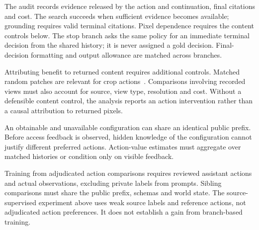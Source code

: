 The audit records evidence released by the action and continuation, final citations and cost. The search succeeds when sufficient evidence becomes available; grounding requires valid terminal citations. Pixel dependence requires the content controls below.
The stop branch asks the same policy for an immediate terminal decision from the shared history; it is never assigned a gold decision. Final-decision formatting and output allowance are matched across branches.

Attributing benefit to returned content requires additional controls.
Matched random patches are relevant for crop actions~\cite{countercredit}.
Comparisons involving recorded views must also account for source, view type, resolution and cost.
Without a defensible content control, the analysis reports an action intervention rather than a causal attribution to returned pixels.

An obtainable and unavailable configuration can share an identical public prefix.
Before access feedback is observed, hidden knowledge of the configuration cannot justify different preferred actions.
Action-value estimates must aggregate over matched histories or condition only on visible feedback.

Training from adjudicated action comparisons requires reviewed assistant actions and actual observations, excluding private labels from prompts.
Sibling comparisons must share the public prefix, schemas and world state.
The source-supervised experiment above uses weak source labels and reference actions, not adjudicated action preferences. It does not establish a gain from branch-based training.

